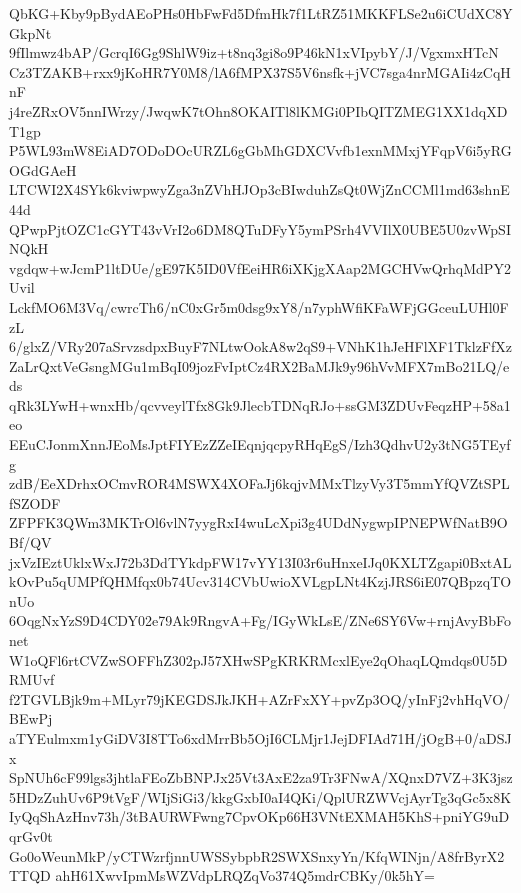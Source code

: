 QbKG+Kby9pBydAEoPHs0HbFwFd5DfmHk7f1LtRZ51MKKFLSe2u6iCUdXC8YGkpNt
9fIlmwz4bAP/GcrqI6Gg9ShlW9iz+t8nq3gi8o9P46kN1xVIpybY/J/VgxmxHTcN
Cz3TZAKB+rxx9jKoHR7Y0M8/lA6fMPX37S5V6nsfk+jVC7sga4nrMGAIi4zCqHnF
j4reZRxOV5nnIWrzy/JwqwK7tOhn8OKAITl8lKMGi0PIbQITZMEG1XX1dqXDT1gp
P5WL93mW8EiAD7ODoDOcURZL6gGbMhGDXCVvfb1exnMMxjYFqpV6i5yRGOGdGAeH
LTCWI2X4SYk6kviwpwyZga3nZVhHJOp3cBIwduhZsQt0WjZnCCMl1md63shnE44d
QPwpPjtOZC1cGYT43vVrI2o6DM8QTuDFyY5ymPSrh4VVIlX0UBE5U0zvWpSINQkH
vgdqw+wJcmP1ltDUe/gE97K5ID0VfEeiHR6iXKjgXAap2MGCHVwQrhqMdPY2Uvil
LckfMO6M3Vq/cwrcTh6/nC0xGr5m0dsg9xY8/n7yphWfiKFaWFjGGceuLUHl0FzL
6/glxZ/VRy207aSrvzsdpxBuyF7NLtwOokA8w2qS9+VNhK1hJeHFlXF1TklzFfXz
ZaLrQxtVeGsngMGu1mBqI09jozFvIptCz4RX2BaMJk9y96hVvMFX7mBo21LQ/eds
qRk3LYwH+wnxHb/qcvveylTfx8Gk9JlecbTDNqRJo+ssGM3ZDUvFeqzHP+58a1eo
EEuCJonmXnnJEoMsJptFIYEzZZeIEqnjqcpyRHqEgS/Izh3QdhvU2y3tNG5TEyfg
zdB/EeXDrhxOCmvROR4MSWX4XOFaJj6kqjvMMxTlzyVy3T5mmYfQVZtSPLfSZODF
ZFPFK3QWm3MKTrOl6vlN7yygRxI4wuLcXpi3g4UDdNygwpIPNEPWfNatB9OBf/QV
jxVzIEztUklxWxJ72b3DdTYkdpFW17vYY13I03r6uHnxeIJq0KXLTZgapi0BxtAL
kOvPu5qUMPfQHMfqx0b74Ucv314CVbUwioXVLgpLNt4KzjJRS6iE07QBpzqTOnUo
6OqgNxYzS9D4CDY02e79Ak9RngvA+Fg/IGyWkLsE/ZNe6SY6Vw+rnjAvyBbFonet
W1oQFl6rtCVZwSOFFhZ302pJ57XHwSPgKRKRMcxlEye2qOhaqLQmdqs0U5DRMUvf
f2TGVLBjk9m+MLyr79jKEGDSJkJKH+AZrFxXY+pvZp3OQ/yInFj2vhHqVO/BEwPj
aTYEulmxm1yGiDV3I8TTo6xdMrrBb5OjI6CLMjr1JejDFIAd71H/jOgB+0/aDSJx
SpNUh6cF99lgs3jhtlaFEoZbBNPJx25Vt3AxE2za9Tr3FNwA/XQnxD7VZ+3K3jsz
5HDzZuhUv6P9tVgF/WIjSiGi3/kkgGxbI0aI4QKi/QplURZWVcjAyrTg3qGc5x8K
IyQqShAzHnv73h/3tBAURWFwng7CpvOKp66H3VNtEXMAH5KhS+pniYG9uDqrGv0t
Go0oWeunMkP/yCTWzrfjnnUWSSybpbR2SWXSnxyYn/KfqWINjn/A8frByrX2TTQD
ahH61XwvIpmMsWZVdpLRQZqVo374Q5mdrCBKy/0k5hY=
